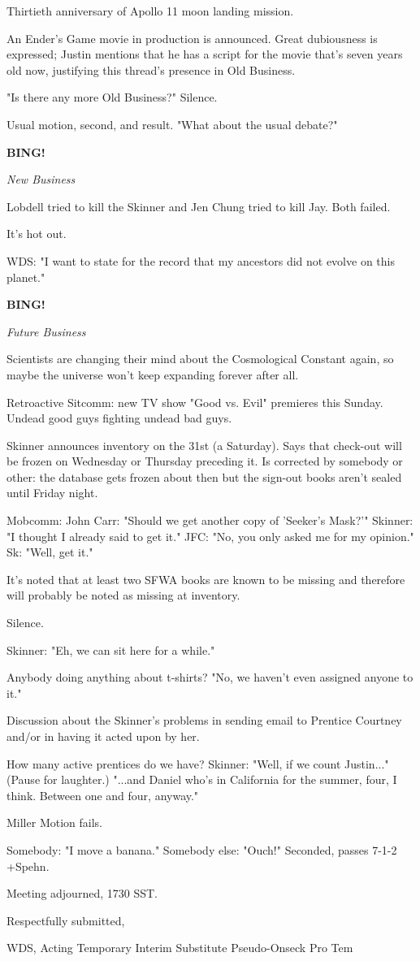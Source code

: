\documentclass[12pt]{article}
\newcommand{\bing}{{\bf BING!} }
\newcommand{\goto}[1]{\bing \vskip 12pt \centerline{{\em{#1}}}}
\begin{document}
Thirtieth anniversary of Apollo 11 moon landing mission.

An Ender's Game movie in production is announced. Great dubiousness is expressed; Justin mentions that he has a script for the movie that's seven years old now, justifying this thread's presence in Old Business.

"Is there any more Old Business?" Silence.

Usual motion, second, and result. "What about the usual debate?"

\goto{New Business}

Lobdell tried to kill the Skinner and Jen Chung tried to kill Jay. Both failed.

It's hot out.

WDS: "I want to state for the record that my ancestors did not evolve on this planet."

\goto{Future Business}

Scientists are changing their mind about the Cosmological Constant again, so maybe the universe won't keep expanding forever after all.

Retroactive Sitcomm: new TV show "Good vs. Evil" premieres this Sunday. Undead good guys fighting undead bad guys.

Skinner announces inventory on the 31st (a Saturday). Says that check-out will be frozen on Wednesday or Thursday preceding it. Is corrected by somebody or other: the database gets frozen about then but the sign-out books aren't sealed until Friday night.

Mobcomm: John Carr: "Should we get another copy of 'Seeker's Mask?'" Skinner: "I thought I already said to get it." JFC: "No, you only asked me for my opinion." Sk: "Well, get it."

It's noted that at least two SFWA books are known to be missing and therefore will probably be noted as missing at inventory.

Silence.

Skinner: "Eh, we can sit here for a while."

Anybody doing anything about t-shirts? "No, we haven't even assigned anyone to it."

Discussion about the Skinner's problems in sending email to Prentice Courtney and/or in having it acted upon by her.

How many active prentices do we have? Skinner: "Well, if we count Justin..." (Pause for laughter.) "...and Daniel who's in California for the summer, four, I think. Between one and four, anyway."

Miller Motion fails.

Somebody: "I move a banana." Somebody else: "Ouch!" Seconded, passes 7-1-2 +Spehn.

\vspace{12pt}

\noindent
Meeting adjourned, 1730 SST.

\vspace{18pt}

\centerline{Respectfully submitted,}
\centerline{WDS, Acting Temporary Interim Substitute Pseudo-Onseck Pro Tem}
\end{document}
